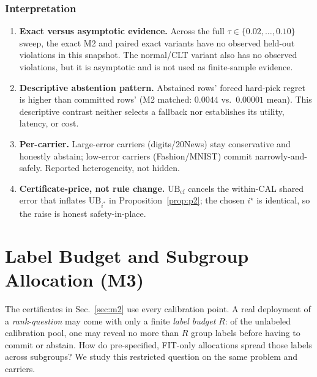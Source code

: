 \documentclass{article}
\begin{document}
\subsubsection{Interpretation}
\begin{enumerate}
\item \textbf{Exact versus asymptotic evidence.} Across the full $\tau\in\{0.02,\dots,0.10\}$
sweep, the exact M2 and paired exact variants have no observed held-out violations in this
snapshot. The normal/CLT variant also has no observed violations, but it is asymptotic and is not used
as finite-sample evidence.
\item \textbf{Descriptive abstention pattern.} Abstained rows' forced hard-pick regret is
higher than committed rows' (M2 matched: $0.0044$ vs.\ $0.00001$ mean). This descriptive
contrast neither selects a fallback nor establishes its utility, latency, or cost.
\item \textbf{Per-carrier.} Large-error carriers (digits/20News) stay conservative and
honestly abstain; low-error carriers (Fashion/MNIST) commit narrowly-and-safely. Reported
heterogeneity, not hidden.
\item \textbf{Certificate-price, not rule change.} $\mathrm{UB}_{\mathrm{cf}}$ cancels the
within-CAL shared error that inflates $\mathrm{UB}_{i^*}$ in Proposition~\ref{prop:p2}; the
chosen $i^\star$ is identical, so the raise is honest safety-in-place.
\end{enumerate}

\section{Label Budget and Subgroup Allocation (M3)}
\label{sec:m3}

The certificates in Sec.~\ref{sec:m2} use every calibration point. A real deployment of a
\emph{rank-question} may come with only a finite \emph{label budget} $R$: of the unlabeled
calibration pool, one may reveal no more than $R$ group labels before having to commit or
abstain. How do pre-specified, FIT-only allocations spread those labels across subgroups? We
study this restricted question on the same problem and carriers.
\end{document}
